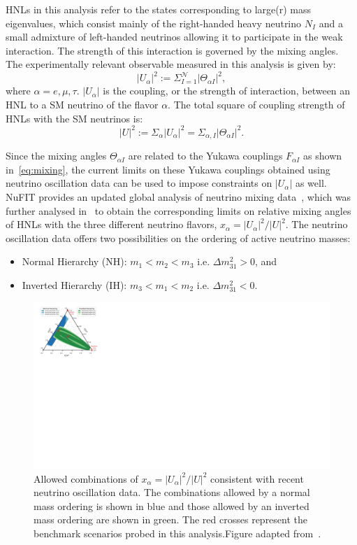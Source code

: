 HNLs in this analysis refer to the states corresponding to large(r) mass eigenvalues, which consist mainly of the right-handed heavy neutrino $N_I$ and a small admixture of left-handed neutrinos allowing it to participate in the weak interaction. The strength of this interaction is governed by the mixing angles. The experimentally relevant observable measured in this analysis is given by:
\begin{equation}
    |U_\alpha|^2 := \Sigma_{I=1}^{\mathcal{N}} |\Theta_{\alpha I}|^2,
\end{equation}
where $\alpha={e,\mu,\tau}$. $|U_\alpha|$ is the coupling, or the strength of interaction, between an HNL to a SM neutrino of the flavor $\alpha$. The total square of coupling strength of HNLs with the SM neutrinos is:
\begin{equation}
    |U|^2 := \Sigma_\alpha |U_\alpha|^2 = \Sigma_{\alpha,I}|\Theta_{\alpha I}|^2.
\end{equation}

Since the mixing angles $\Theta_{\alpha I}$ are related to the Yukawa couplings $F_{\alpha I}$ as shown in~\cref{eq:mixing}, the current limits on these Yukawa couplings obtained using neutrino oscillation data can be used to impose constraints on $|U_\alpha|$ as well. NuFIT provides an updated global analysis of neutrino mixing data~\cite{Esteban2020}, which was further analysed in~\cite{Tastet2021} to obtain the corresponding limits on relative mixing angles of HNLs with the three different neutrino flavors, $x_\alpha = |U_\alpha|^2 / |U|^2$. The neutrino oscillation data offers two possibilities on the ordering of active neutrino masses:
\begin{itemize}
    \item Normal Hierarchy (NH): $m_1 < m_2 < m_3$ i.e. $\Delta m_{31}^2 > 0$, and
    \item Inverted Hierarchy (IH): $m_3 < m_1 < m_2$ i.e. $\Delta m_{31}^2 < 0$.
\end{itemize}

\begin{figure}[!htb]
    \centering
    \includegraphics[width=.6\linewidth]{figures/theory/Jean_Loup_IH_NH_diagram.pdf}
    \caption{Allowed combinations of $x_\alpha = |U_\alpha|^2 / |U|^2$ consistent with recent neutrino oscillation data. The combinations allowed by a normal mass ordering is shown in blue and those allowed by an inverted mass ordering are shown in green. The red crosses represent the benchmark scenarios probed in this analysis.Figure adapted from~\cite{Tastet2021}.}
    \label{fig:IH_NH_diagram}
\end{figure}

